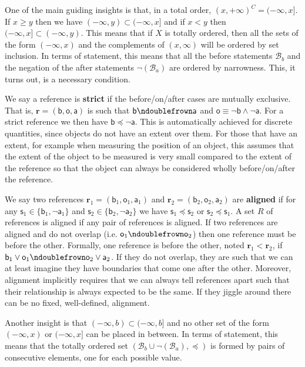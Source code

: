 \documentclass[submission,copyright,creativecommons]{eptcs}
\def\AND{\wedge}
\def\OR{\vee}
\def\NOT{\neg}
\newcommand{\stmt}[1][s] {\mathsf{#1}} %
\def\ncomp{\ndoublefrown}
\def\narrower{\preccurlyeq} %
\newcommand{\basis}[1][B] {\mathcal{#1}} %
\newcommand{\refStmt}[1][r]{\textbf{#1}}
\begin{document}
One of the main guiding insights is that, in a total order, $(x, +\infty) ^C = (-\infty, x]$. If $x \geq y$ then we have $(-\infty, y) \subset (-\infty, x]$ and if $x < y$ then $(-\infty, x] \subset (-\infty, y)$. This means that if $X$ is totally ordered, then all the sets of the form $(-\infty, x)$ and the complements of $(x, \infty)$ will be ordered by set inclusion. In terms of statement, this means that all the before statements $\basis_b$ and the negation of the after statements $\NOT(\basis_a)$ are ordered by narrowness. This, it turns out, is a necessary condition.

We say a reference is \textbf{strict} if the before/on/after cases are mutually exclusive. That is, $\refStmt = (\stmt[b], \stmt[o], \stmt[a])$ is such that $\stmt[b] \ncomp \stmt[a]$ and $\stmt[o] \equiv \NOT \stmt[b] \AND \NOT \stmt[a]$. For a strict reference we then have $\stmt[b] \narrower \NOT \stmt[a]$. This is automatically achieved for discrete quantities, since objects do not have an extent over them. For those that have an extent, for example when measuring the position of an object, this assumes that the extent of the object to be measured is very small compared to the extent of the reference so that the object can always be considered wholly before/on/after the reference.

We say two references $\refStmt_1 = (\stmt[b]_1, \stmt[o]_1, \stmt[a]_1)$ and $\refStmt_2 = (\stmt[b]_2, \stmt[o]_2, \stmt[a]_2)$ are \textbf{aligned} if for any $\stmt_1 \in \{ \stmt[b]_1, \NOT\stmt[a]_1\}$ and $\stmt_2 \in \{ \stmt[b]_2, \NOT\stmt[a]_2\}$ we have 
$\stmt_1 \narrower \stmt_2$ or $\stmt_2 \narrower \stmt_1$. A set $R$ of references is aligned if any pair of references is aligned. If two references are aligned and do not overlap (i.e. $\stmt[o]_1 \ncomp \stmt[o]_2$) then one reference must be before the other. Formally, one reference is before the other, noted $\refStmt_1 \less \refStmt_2$, if $\stmt[b]_1 \OR \stmt[o]_1 \ncomp \stmt[o]_2 \OR \stmt[a]_2$. If they do not overlap, they are such that we can at least imagine they have boundaries that come one after the other. Moreover, alignment implicitly requires that we can always tell references apart such that their relationship is always expected to be the same. If they jiggle around there can be no fixed, well-defined, alignment.

Another insight is that $(-\infty, b) \subset (-\infty, b]$ and no other set of the form $(-\infty, x)$ or $(-\infty, x]$ can be placed in between. In terms of statement, this means that the totally ordered set $( \basis_b \cup \NOT(\basis_a), \narrower)$ is formed by pairs of consecutive elements, one for each possible value.
\end{document}
